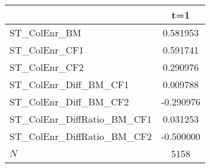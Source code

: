 {
\def\sym#1{\ifmmode^{#1}\else\(^{#1}\)\fi}
\begin{tabular}{l*{1}{c}}
\hline\hline
            &\multicolumn{1}{c}{t=1}\\
\hline
ST\_ColEnr\_BM&    0.581953\\
ST\_ColEnr\_CF1&    0.591741\\
ST\_ColEnr\_CF2&    0.290976\\
ST\_ColEnr\_Diff\_BM\_CF1&    0.009788\\
ST\_ColEnr\_Diff\_BM\_CF2&   -0.290976\\
ST\_ColEnr\_DiffRatio\_BM\_CF1&    0.031253\\
ST\_ColEnr\_DiffRatio\_BM\_CF2&   -0.500000\\
\hline
\(N\)       &        5158\\
\hline\hline
\end{tabular}
}
